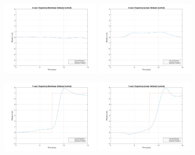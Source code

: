 \begin{figure}
    \centering
    \includegraphics[width=0.45\textwidth]{graphics/experiment_plots/roll_plus_non_position_x.png}
    \includegraphics[width=0.45\textwidth]{graphics/experiment_plots/roll_plus_pid_position_x.png}
    
    \includegraphics[width=0.45\textwidth]{graphics/experiment_plots/roll_plus_non_position_y.png}
    \includegraphics[width=0.45\textwidth]{graphics/experiment_plots/roll_plus_pid_position_y.png}
    

\end{figure}
